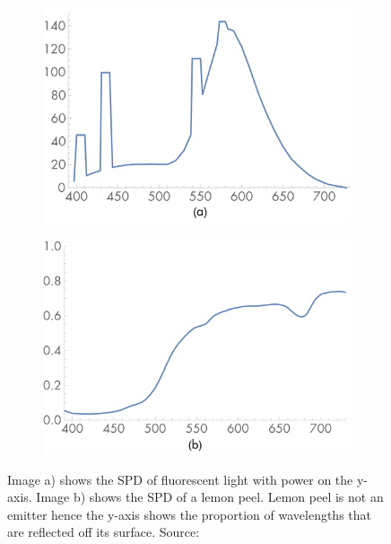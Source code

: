\begin{figure}[ht]
    \centering
    \begin{subfigure}[b]{0.49\textwidth}
        \centering
        \includegraphics[width=\textwidth]{images/02-spd_fluorescent_light.png}
        \caption*{}
    \end{subfigure}
    \hfill
    \begin{subfigure}[b]{0.49\textwidth}
        \centering
        \includegraphics[width=\textwidth]{images/02-spd_lemon_peel.png}
        \caption*{}
    \end{subfigure}
    \caption{Image a) shows the SPD of fluorescent light with power on the y-axis. Image b) shows the SPD of a lemon peel. Lemon peel is not an emitter hence the y-axis shows the proportion of wavelengths that are reflected off its surface. Source: \citet{PBRT3e}}
    \label{fig:background_spd}
\end{figure}

